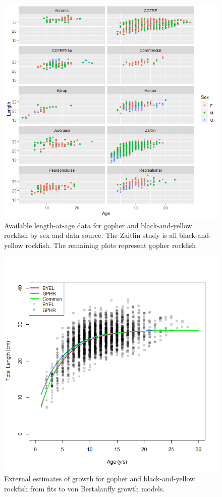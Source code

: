 \documentclass[12pt,]{article}
\begin{document}
\FloatBarrier

\begin{figure}
\centering
\includegraphics{Figures/Age_length_by_study.png}
\caption{Available length-at-age data for gopher and black-and-yellow
rockfish by sex and data source. The Zaitlin study is all
black-and-yellow rockfish. The remaining plots represent gopher rockfish
\label{fig:Age_length_by_study}}
\end{figure}

\begin{figure}
\centering
\includegraphics{Figures/Growth_by_species.png}
\caption{External estimates of growth for gopher and black-and-yellow
rockfish from fits to von Bertalanffy growth models.
\label{Growth_by_species}}
\end{figure}
\end{document}
